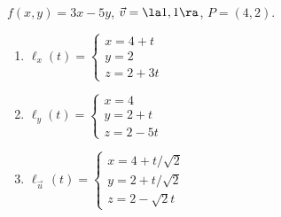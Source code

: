 {$f(x,y) = 3x-5y$,  $\vec v = \la 1,1\ra$, $P=(4,2)$.
}
{
\begin{enumerate}
	\item $\ell_x(t) = \left\{\begin{array}{l} x = 4+t\\ y = 2 \\ z = 2 + 3t \end{array} \right.$ 
	
	\item $\ell_y(t) = \left\{\begin{array}{l} x = 4\\ y = 2+t\\ z = 2-5t \end{array} \right.$
	
	\item $\ell_{\vec u\,}(t) = \left\{\begin{array}{l} x = 4+t/\sqrt{2}\\ y = 2+t/\sqrt{2} \\ z = 2 -\sqrt{2}t \end{array} \right.$
\end{enumerate}
}